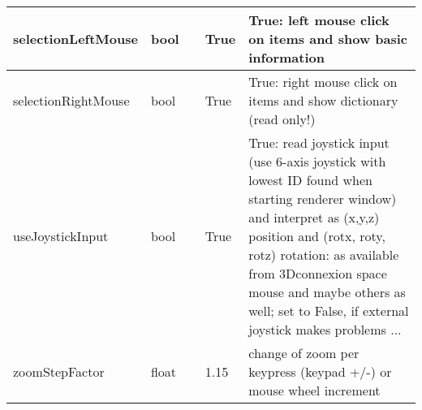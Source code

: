 \begin{center}
\begin{longtable}{| p{4.2cm} | p{2.5cm} | p{0.3cm} | p{3.0cm} | p{6cm} |}
    selectionLeftMouse &     bool &      &     True &     True: left mouse click on items and show basic information\\ \hline
    selectionRightMouse &     bool &      &     True &     True: right mouse click on items and show dictionary (read only!)\\ \hline
    useJoystickInput &     bool &      &     True &     True: read joystick input (use 6-axis joystick with lowest ID found when starting renderer window) and interpret as (x,y,z) position and (rotx, roty, rotz) rotation: as available from 3Dconnexion space mouse and maybe others as well; set to False, if external joystick makes problems ...\\ \hline
    zoomStepFactor &     float &      &     1.15 &     change of zoom per keypress (keypad +/-) or mouse wheel increment\\ \hline
	  \end{longtable}
	\end{center}

